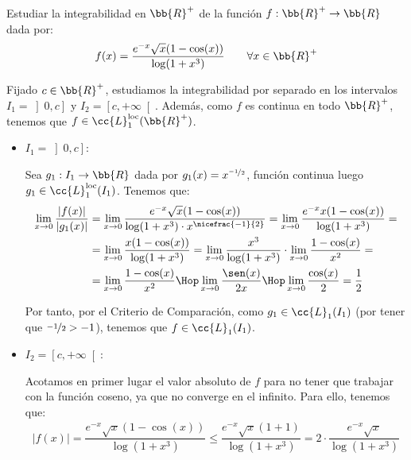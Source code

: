 \begin{ejercicio}
    Estudiar la integrabilidad en $\bb{R}^+$ de la función $f:\bb{R}^+\to \bb{R}$ dada por:
    \begin{equation*}
        f(x) = \dfrac{e^{-x} \sqrt{x}(1-\cos(x))}{\log(1+x^3)} \qquad \forall x \in \bb{R}^+
    \end{equation*}

    Fijado $c\in \bb{R}^+$, estudiamos la integrabilidad por separado en los intervalos $I_1=\left]0,c\right]$ y $I_2=\left[c,+\infty\right[$. Además,
    como $f$ es continua en todo $\bb{R}^+$, tenemos que $f\in \cc{L}_1^{\text{loc}}(\bb{R}^+)$.
    \begin{itemize}
        \item \ul{$I_1=\left]0,c\right]$}:
        
        Sea $g_1:I_1\to \bb{R}$ dada por $g_1(x)=x^{\nicefrac{-1}{2}}$, función continua luego $g_1\in \cc{L}_1^{\text{loc}}(I_1)$. Tenemos que:
        \begin{align*}
            \lim_{x\to 0} \dfrac{|f(x)|}{|g_1(x)|}
            &= \lim_{x\to 0} \dfrac{e^{-x} \sqrt{x}(1-\cos(x))}{\log(1+x^3)\cdot x^{\nicefrac{-1}{2}}}
            = \lim_{x\to 0} \dfrac{e^{-x} x(1-\cos(x))}{\log(1+x^3)}
            =\\&= \lim_{x\to 0} \dfrac{x(1-\cos(x))}{\log(1+x^3)}
            = \lim_{x\to 0} \dfrac{x^3}{\log(1+x^3)} \cdot \lim_{x\to 0} \dfrac{1-\cos(x)}{x^2}
            =\\&= \lim_{x\to 0} \dfrac{1-\cos(x)}{x^2} \Hop \lim_{x\to 0} \dfrac{\sen(x)}{2x} \Hop \lim_{x\to 0} \dfrac{\cos(x)}{2} = \dfrac{1}{2}
        \end{align*}

        Por tanto, por el Criterio de Comparación, como $g_1\in \cc{L}_1(I_1)$ (por tener que $\nicefrac{-1}{2}>-1$), tenemos que $f\in \cc{L}_1(I_1)$.

        \item \ul{$I_2=\left[c,+\infty\right[$}:
        
        Acotamos en primer lugar el valor absoluto de $f$ para no tener que trabajar con la función coseno,
        ya que no converge en el infinito. Para ello, tenemos que:
        \begin{align*}
            |f(x)| = \dfrac{e^{-x} \sqrt{x}(1-\cos(x))}{\log(1+x^3)} \leq \dfrac{e^{-x} \sqrt{x}(1+1)}{\log(1+x^3)} = 2\cdot \dfrac{e^{-x} \sqrt{x}}{\log(1+x^3)}
        \end{align*}
        

\end{itemize}
\end{ejercicio}
